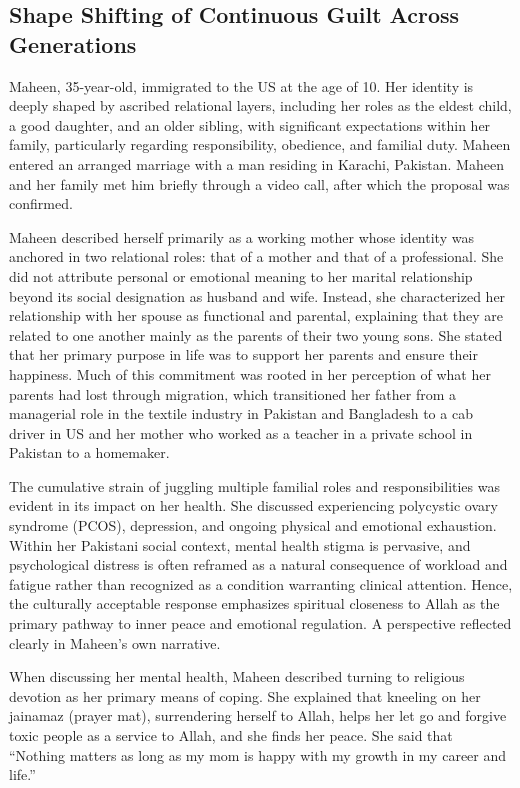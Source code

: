 \subsection{Shape Shifting of Continuous Guilt Across Generations}

Maheen, 35-year-old, immigrated to the US at the age of 10. Her identity is deeply shaped by ascribed relational layers, including her roles as the eldest child, a good daughter, and an older sibling, with significant expectations within her family, particularly regarding responsibility, obedience, and familial duty. Maheen entered an arranged marriage with a man residing in Karachi, Pakistan. Maheen and her family met him briefly through a video call, after which the proposal was confirmed.

Maheen described herself primarily as a working mother whose identity was anchored in two relational roles: that of a mother and that of a professional. She did not attribute personal or emotional meaning to her marital relationship beyond its social designation as husband and wife. Instead, she characterized her relationship with her spouse as functional and parental, explaining that they are related to one another mainly as the parents of their two young sons. She stated that her primary purpose in life was to support her parents and ensure their happiness. Much of this commitment was rooted in her perception of what her parents had lost through migration, which transitioned her father from a managerial role in the textile industry in Pakistan and Bangladesh to a cab driver in US and her mother who worked as a teacher in a private school in Pakistan to a homemaker. 

The cumulative strain of juggling multiple familial roles and responsibilities was evident in its impact on her health. She discussed experiencing polycystic ovary syndrome (PCOS), depression, and ongoing physical and emotional exhaustion. Within her Pakistani social context, mental health stigma is pervasive, and psychological distress is often reframed as a natural consequence of workload and fatigue rather than recognized as a condition warranting clinical attention. Hence, the culturally acceptable response emphasizes spiritual closeness to Allah as the primary pathway to inner peace and emotional regulation. A perspective reflected clearly in Maheen’s own narrative.

When discussing her mental health, Maheen described turning to religious devotion as her primary means of coping. She explained that kneeling on her jainamaz (prayer mat), surrendering herself to Allah, helps her let go and forgive toxic people as a service to Allah, and she finds her peace. She said that ``Nothing matters as long as my mom is happy with my growth in my career and life.''

